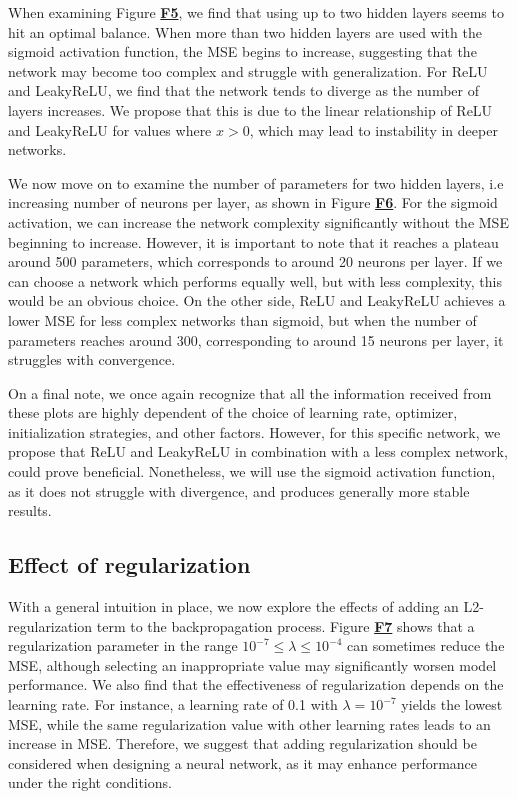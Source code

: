 \documentclass{article}
\begin{document}
\begin{multicols}{2}
When examining Figure \hyperref[fig:F5]{\textbf{F5}}, we find that using up to two hidden layers seems to hit an optimal balance. When more than two hidden layers are used with the sigmoid activation function, the MSE begins to increase, suggesting that the network may become too complex and struggle with generalization. For ReLU and LeakyReLU, we find that the network tends to diverge as the number of layers increases. We propose that this is due to the linear relationship of ReLU and LeakyReLU for values where $x > 0$, which may lead to instability in deeper networks.

We now move on to examine the number of parameters for two hidden layers, i.e increasing number of neurons per layer, as shown in Figure \hyperref[fig:F6]{\textbf{F6}}. For the sigmoid activation, we can increase the network complexity significantly without the MSE beginning to increase. However, it is important to note that it reaches a plateau around 500 parameters, which corresponds to around 20 neurons per layer. If we can choose a network which performs equally well, but with less complexity, this would be an obvious choice. On the other side, ReLU and LeakyReLU achieves a lower MSE for less complex networks than sigmoid, but when the number of parameters reaches around 300, corresponding to around 15 neurons per layer, it struggles with convergence. 

On a final note, we once again recognize that all the information received from these plots are highly dependent of the choice of learning rate, optimizer, initialization strategies, and other factors. However, for this specific network, we propose that ReLU and LeakyReLU in combination with a less complex network, could prove beneficial. Nonetheless, we will use the sigmoid activation function, as it does not struggle with divergence, and produces generally more stable results. 

\subsection*{Effect of regularization}
With a general intuition in place, we now explore the effects of adding an L2-regularization term to the backpropagation process. Figure \hyperref[fig:F7]{\textbf{F7}} shows that a regularization parameter in the range $10^{-7} \leq \lambda \leq 10^{-4}$ can sometimes reduce the MSE, although selecting an inappropriate value may significantly worsen model performance. We also find that the effectiveness of regularization depends on the learning rate. For instance, a learning rate of 0.1 with $\lambda = 10^{-7}$ yields the lowest MSE, while the same regularization value with other learning rates leads to an increase in MSE. Therefore, we suggest that adding regularization should be considered when designing a neural network, as it may enhance performance under the right conditions.


\end{multicols}
\end{document}
